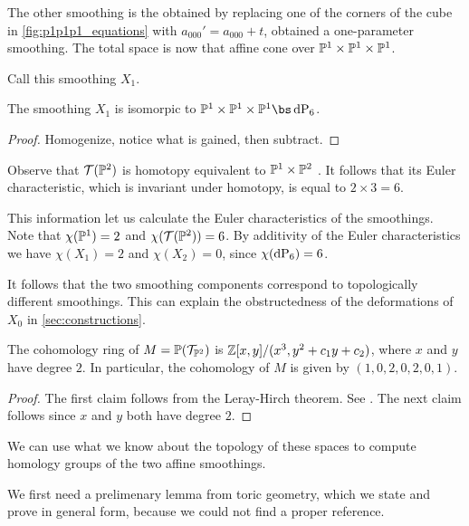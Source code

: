 The other smoothing is the obtained by replacing one of the corners of the cube in \cref{fig:p1p1p1_equations} with $a_{000}'=a_{000}+t$, obtained a one-parameter smoothing. The total space is now that affine cone over $\P^1 \times \P^1 \times \P^1$. 

Call this smoothing $X_1.$

\begin{lemma}
The smoothing $X_1$ is isomorpic to $\P^1 \times \P^1 \times \P^1 \bs \dP6$.
\end{lemma}
\begin{proof}
Homogenize, notice what is gained, then subtract.
\end{proof}

Observe that $\mathcal T(\P^2)$ is homotopy equivalent to $\P^1 \times \P^2$ . It follows that its Euler characteristic, which is invariant under homotopy, is equal to $2 \times 3=6$.

This information let us calculate the Euler characteristics of the smoothings. Note that $\chi(\P^1)=2$ and $\chi(\mathcal T(\P^2))=6$. By additivity of the Euler characteristics we have $\chi(X_1)=2$ and $\chi(X_2)=0$, since $\chi(\dP6)=6$.

It follows that the two smoothing components correspond to topologically different smoothings. This can explain the obstructedness of the deformations of $X_0$ in \cref{sec:constructions}.


\begin{lemma}
The cohomology ring of $M=\P(\mathcal T_{\P^2})$ is $\Z[x,y]/(x^3,y^2+c_1y+c_2)$, where $x$ and $y$ have degree $2$. In particular, the cohomology of $M$ is given by $(1,0,2,0,2,0,1)$.
\end{lemma}
\begin{proof}
The first claim follows from the Leray-Hirch theorem. See \cite[page 270]{bott_tu}. The next claim follows since $x$ and $y$ both have degree $2$.
\end{proof}

We can use what we know about the topology of these spaces to compute homology groups of the two affine smoothings.

We first need a prelimenary lemma from toric geometry, which we state and prove in general form, because we could not find a proper reference.

